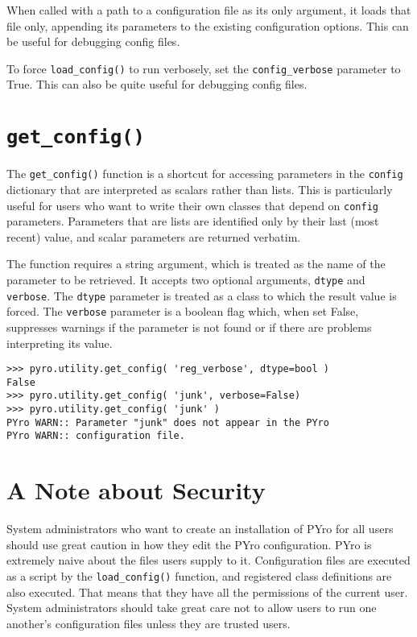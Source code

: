 When called with a path to a configuration file as its only argument, it loads that file only, appending its parameters to the existing configuration options.  This can be useful for debugging config files.

To force \verb|load_config()| to run verbosely, set the \verb|config_verbose| parameter to True.  This can also be quite useful for debugging config files.

\section{\texttt{get\_config()}}\label{sec:getconfig}
The \verb|get_config()| function is a shortcut for accessing parameters in the \verb|config| dictionary that are interpreted as scalars rather than lists.  This is particularly useful for users who want to write their own classes that depend on \verb|config| parameters.  Parameters that are lists are identified only by their last (most recent) value, and scalar parameters are returned verbatim.

The function requires a string argument, which is treated as the name of the parameter to be retrieved.  It accepts two optional arguments, \verb|dtype| and \verb|verbose|.  The \verb|dtype| parameter is treated as a class to which the result value is forced.  The \verb|verbose| parameter is a boolean flag which, when set False, suppresses warnings if the parameter is not found or if there are problems interpreting its value.
\begin{verbatim}
>>> pyro.utility.get_config( 'reg_verbose', dtype=bool )
False
>>> pyro.utility.get_config( 'junk', verbose=False)
>>> pyro.utility.get_config( 'junk' )
PYro WARN:: Parameter "junk" does not appear in the PYro
PYro WARN:: configuration file.
\end{verbatim}

\section{A Note about Security}
System administrators who want to create an installation of PYro for all users should use great caution in how they edit the PYro configuration.  PYro is extremely naive about the files users supply to it.  Configuration files are executed as a script by the \verb|load_config()| function, and registered class definitions are also executed.  That means that they have all the permissions of the current user.  System administrators should take great care not to allow users to run one another's configuration files unless they are trusted users.

